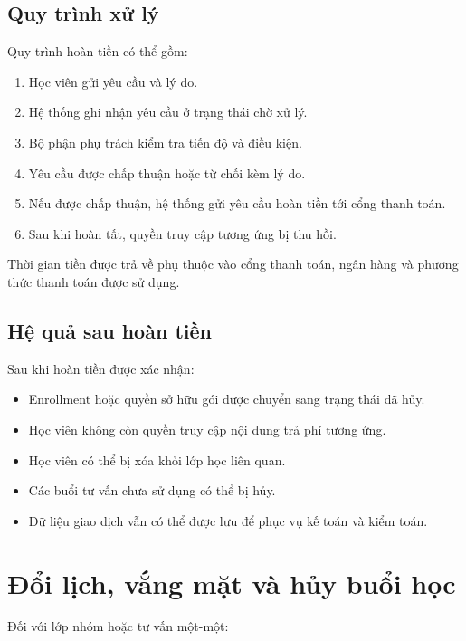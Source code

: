 \documentclass[12pt,a4paper]{article}
\begin{document}
\subsection{Quy trình xử lý}

Quy trình hoàn tiền có thể gồm:

\begin{enumerate}
    \item Học viên gửi yêu cầu và lý do.
    \item Hệ thống ghi nhận yêu cầu ở trạng thái chờ xử lý.
    \item Bộ phận phụ trách kiểm tra tiến độ và điều kiện.
    \item Yêu cầu được chấp thuận hoặc từ chối kèm lý do.
    \item Nếu được chấp thuận, hệ thống gửi yêu cầu hoàn tiền tới cổng thanh toán.
    \item Sau khi hoàn tất, quyền truy cập tương ứng bị thu hồi.
\end{enumerate}

Thời gian tiền được trả về phụ thuộc vào cổng thanh toán, ngân hàng
và phương thức thanh toán được sử dụng.

\subsection{Hệ quả sau hoàn tiền}

Sau khi hoàn tiền được xác nhận:

\begin{itemize}
    \item Enrollment hoặc quyền sở hữu gói được chuyển sang trạng thái đã hủy.
    \item Học viên không còn quyền truy cập nội dung trả phí tương ứng.
    \item Học viên có thể bị xóa khỏi lớp học liên quan.
    \item Các buổi tư vấn chưa sử dụng có thể bị hủy.
    \item Dữ liệu giao dịch vẫn có thể được lưu để phục vụ kế toán và kiểm toán.
\end{itemize}

\section{Đổi lịch, vắng mặt và hủy buổi học}

Đối với lớp nhóm hoặc tư vấn một-một:
\end{document}
